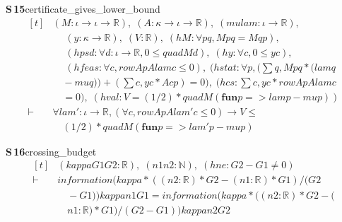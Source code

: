 \documentclass[conference]{IEEEtran}
\theoremstyle{definition}
\newcommand{\lean}[1]{\textsf{\footnotesize #1}}
\begin{document}
\noindent\textbf{S\,15}\quad\lean{certificate\_gives\_lower\_bound}
{\footnotesize\[ \begin{aligned}[t]
&(\mathit{M} : \iota \to \iota \to \mathbb{R} ),\; (\mathit{A} : \kappa \to \iota \to \mathbb{R} ),\; (\mathit{mu} \mathit{lam} : \iota \to \mathbb{R} ),\\
&\quad \; (\mathit{y} : \kappa \to \mathbb{R} ),\; (\mathit{V} : \mathbb{R} ),\; (\mathit{hM} : \forall \mathit{p} \mathit{q}, \mathit{M} \mathit{p} \mathit{q} = \mathit{M} \mathit{q} \mathit{p}),\\
&\quad \; (\mathit{hpsd} : \forall \mathit{d} : \iota \to \mathbb{R} , 0 \leq \mathit{quad} \mathit{M} \mathit{d}),\; (\mathit{hy} : \forall \mathit{c}, 0 \leq \mathit{y} \mathit{c}),\\
&\quad \; (\mathit{hfeas} : \forall \mathit{c}, \mathit{rowAp} \mathit{A} \mathit{lam} \mathit{c} \leq 0),\; (\mathit{hstat} : \forall \mathit{p}, (\textstyle\sum \mathit{q}, \mathit{M} \mathit{p} \mathit{q} * (\mathit{lam} \mathit{q}\\
&\quad - \mathit{mu} \mathit{q})) + (\textstyle\sum \mathit{c}, \mathit{y} \mathit{c} * \mathit{A} \mathit{c} \mathit{p}) = 0),\; (\mathit{hcs} : \textstyle\sum \mathit{c}, \mathit{y} \mathit{c} * \mathit{rowAp} \mathit{A} \mathit{lam} \mathit{c}\\
&\quad = 0),\; (\mathit{hval} : \mathit{V} = (1/2) * \mathit{quad} \mathit{M} (\mathbf{fun} \mathit{p} => \mathit{lam} \mathit{p} - \mathit{mu} \mathit{p}))\\
\vdash\;&\forall \mathit{lam'} : \iota \to \mathbb{R} , (\forall \mathit{c}, \mathit{rowAp} \mathit{A} \mathit{lam'} \mathit{c} \leq 0) \to \mathit{V} \leq\\
&\quad (1/2) * \mathit{quad} \mathit{M} (\mathbf{fun} \mathit{p} => \mathit{lam'} \mathit{p} - \mathit{mu} \mathit{p})
\end{aligned} \]}

\noindent\textbf{S\,16}\quad\lean{crossing\_budget}
{\footnotesize\[ \begin{aligned}[t]
&(\mathit{kappa} \mathit{G1} \mathit{G2} : \mathbb{R} ),\; (\mathit{n1} \mathit{n2} : \mathbb{N} ),\; (\mathit{hne} : \mathit{G2} - \mathit{G1} \neq 0)\\
\vdash\;&\mathit{information} (\mathit{kappa} * ((\mathit{n2} : \mathbb{R} ) * \mathit{G2} - (\mathit{n1} : \mathbb{R} ) * \mathit{G1}) / (\mathit{G2}\\
&\quad - \mathit{G1})) \mathit{kappa} \mathit{n1} \mathit{G1} = \mathit{information} (\mathit{kappa} * ((\mathit{n2} : \mathbb{R} ) * \mathit{G2} - (\\
&\quad \mathit{n1} : \mathbb{R} ) * \mathit{G1}) / (\mathit{G2} - \mathit{G1})) \mathit{kappa} \mathit{n2} \mathit{G2}
\end{aligned} \]}
\end{document}

